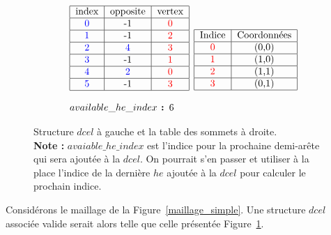 \documentclass[]{article}
\begin{document}
\begin{figure}[H]
	\[
		\begin{aligned}[c]
			\begin{array}{l}
				\begin{tabular}{|c|c|c|c|}
					\hline
					index         & opposite      & vertex       \\
					\hline
					\color{blue}0 & -1            & \color{red}0 \\
					\hline
					\color{blue}1 & -1            & \color{red}2 \\
					\hline
					\color{blue}2 & \color{blue}4 & \color{red}3 \\
					\hline
					\color{blue}3 & -1            & \color{red}1 \\
					\hline
					\color{blue}4 & \color{blue}2 & \color{red}0 \\
					\hline
					\color{blue}5 & -1            & \color{red}3 \\
					\hline
				\end{tabular} \\\\
				available\_he\_index\textbf{ : }6
			\end{array}
		\end{aligned}
		\begin{aligned}[c]
			\begin{tabular}{|c|c|}
				\hline
				Indice       & Coordonnées \\
				\hline
				\color{red}0 & (0,0)       \\
				\hline
				\color{red}1 & (1,0)       \\
				\hline
				\color{red}2 & (1,1)       \\
				\hline
				\color{red}3 & (0,1)       \\
				\hline
			\end{tabular}
		\end{aligned}
	\]
	\caption{Structure $dcel$ à gauche et la table des sommets à droite.\\\textbf{Note :} $avaiable\_he\_index$ est l'indice pour la prochaine demi-arête qui sera ajoutée à la $dcel$. On pourrait s'en passer et utiliser à la place l'indice de la dernière $he$ ajoutée à la $dcel$ pour calculer le prochain indice.}
	\label{maillage_simple_struct_associee}
\end{figure}

Considérons le maillage de la Figure~\ref{maillage_simple}. Une structure $dcel$ associée valide serait alors telle que celle présentée Figure~\ref{maillage_simple_struct_associee}.
\end{document}
